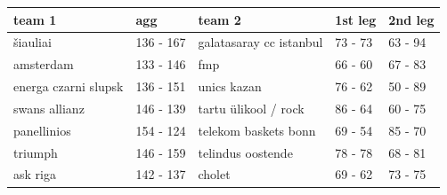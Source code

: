 \documentclass{article}
\begin{document}
\begin{tabular}{lllll}
\toprule
team 1 & agg & team 2 & 1st leg & 2nd leg \\
\midrule
šiauliai & 136 - 167 & galatasaray cc istanbul & 73 - 73 & 63 - 94 \\
amsterdam & 133 - 146 & fmp & 66 - 60 & 67 - 83 \\
energa czarni slupsk & 136 - 151 & unics kazan & 76 - 62 & 50 - 89 \\
swans allianz & 146 - 139 & tartu ülikool / rock & 86 - 64 & 60 - 75 \\
panellinios & 154 - 124 & telekom baskets bonn & 69 - 54 & 85 - 70 \\
triumph & 146 - 159 & telindus oostende & 78 - 78 & 68 - 81 \\
ask riga & 142 - 137 & cholet & 69 - 62 & 73 - 75 \\
\bottomrule
\end{tabular}
\end{document}
